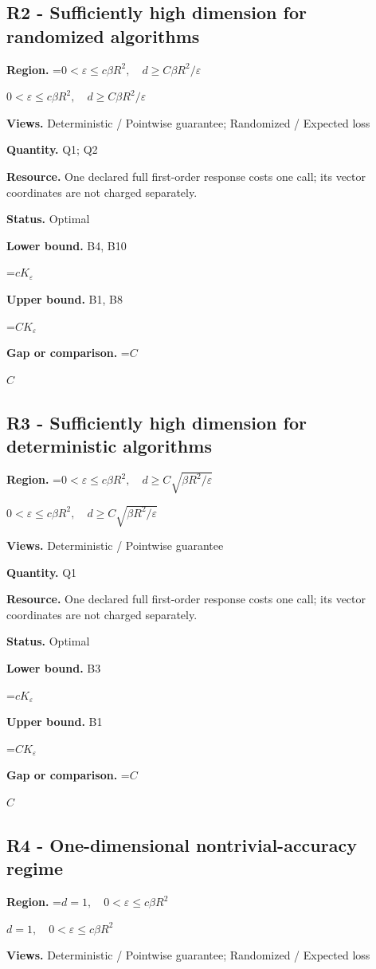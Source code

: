 \documentclass[10pt,a4paper]{article}
\newcommand{\AtlasMath}[1]{\par\begingroup\centering\setbox0=\hbox{$\displaystyle #1$}\ifdim\wd0>1.4\linewidth\typeout{ATLAS WIDE FORMULA: \the\wd0}\fi\ifdim\wd0>\linewidth\resizebox{\linewidth}{!}{\box0}\else\box0\fi\par\endgroup}
\newcommand{\AtlasInlineMath}[1]{\begingroup\setbox0=\hbox{$#1$}\ifdim\wd0>.4\linewidth\endgroup\AtlasMath{#1}\else\endgroup$#1$\fi}
\begin{document}
\subsection{R2 - Sufficiently high dimension for randomized algorithms}
\textbf{Region.} \AtlasInlineMath{0<\varepsilon\le c\beta R^2,\quad d\ge C\beta R^2/\varepsilon}

\textbf{Views.} Deterministic / Pointwise guarantee; Randomized / Expected loss

\textbf{Quantity.} Q1; Q2

\textbf{Resource.} One declared full first-order response costs one call; its vector coordinates are not charged separately.

\textbf{Status.} Optimal

\textbf{Lower bound.} B4, B10

\AtlasMath{c K_\varepsilon}
\textbf{Upper bound.} B1, B8

\AtlasMath{C K_\varepsilon}
\textbf{Gap or comparison.} \AtlasInlineMath{C}

\subsection{R3 - Sufficiently high dimension for deterministic algorithms}
\textbf{Region.} \AtlasInlineMath{0<\varepsilon\le c\beta R^2,\quad d\ge C\sqrt{\beta R^2/\varepsilon}}

\textbf{Views.} Deterministic / Pointwise guarantee

\textbf{Quantity.} Q1

\textbf{Resource.} One declared full first-order response costs one call; its vector coordinates are not charged separately.

\textbf{Status.} Optimal

\textbf{Lower bound.} B3

\AtlasMath{c K_\varepsilon}
\textbf{Upper bound.} B1

\AtlasMath{C K_\varepsilon}
\textbf{Gap or comparison.} \AtlasInlineMath{C}

\subsection{R4 - One-dimensional nontrivial-accuracy regime}
\textbf{Region.} \AtlasInlineMath{d=1,\quad0<\varepsilon\le c\beta R^2}

\textbf{Views.} Deterministic / Pointwise guarantee; Randomized / Expected loss
\end{document}
